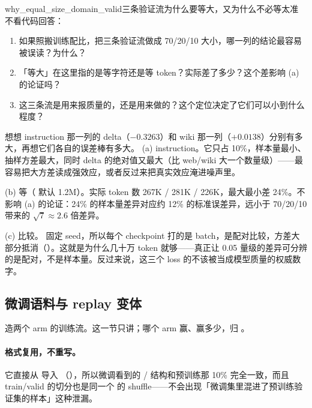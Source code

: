 \begin{checkpoint}{why_equal_size_domain_valid}{三条验证流为什么要等大，又为什么不必等太准}
不看代码回答：
\begin{enumerate}[label=(\alph*)]
  \item 如果照搬训练配比，把三条验证流做成 70/20/10 大小，哪一列的结论最容易被误读？为什么？
  \item 「等大」在这里指的是等字符还是等 token？实际差了多少？这个差影响 (a) 的论证吗？
  \item 这三条流是用来报质量的，还是用来做的？这个定位决定了它们可以小到什么程度？
\end{enumerate}
\hint 想想 instruction 那一列的 delta（$-0.3263$）和 wiki 那一列（$+0.0138$）分别有多大，再想它们各自的误差棒有多大。
\ifshowanswers
\tcblower
\answer (a) instruction。它只占 10\%，样本量最小、抽样方差最大，同时 delta 的绝对值又最大（比 web/wiki 大一个数量级）——最容易把大方差读成强效应，或者反过来把真实效应淹进噪声里。

(b) 等（ 默认 1.2M）。实际 token 数 267K / 281K / 226K，最大最小差 24\%。不影响 (a) 的论证：24\% 的样本量差异对应约 12\% 的标准误差异，远小于 70/20/10 带来的 $\sqrt{7}\approx 2.6$ 倍差异。

(c) 比较。 固定 seed，所以每个 checkpoint 打的是 batch，是配对比较，方差大部分抵消（）。这就是为什么几十万 token 就够——真正让 0.05 量级的差异可分辨的是配对，不是样本量。反过来说，这三个 loss 的不该被当成模型质量的权威数字。
\whereincode {}
\fi
\end{checkpoint}

\subsection{微调语料与 replay 变体}
\label{subsec:sft-corpus}

 造两个 arm 的训练流。这一节只讲；哪个 arm 赢、赢多少，归 。

\paragraph{格式复用，不重写。}它直接从  导入 （），所以微调看到的  /  结构和预训练那 10\% 完全一致，而且 train/valid 的切分也是同一个  的 shuffle——不会出现「微调集里混进了预训练验证集的样本」这种泄漏。

